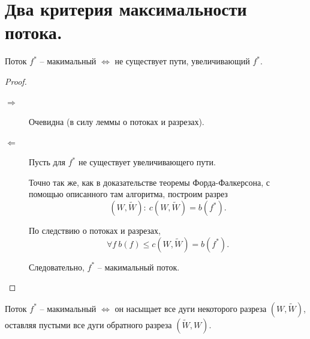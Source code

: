 \section{Два критерия максимальности потока.}

\begin{theorem}
    Поток $ f^* $ -- макимальный $ \iff $ не существует пути, увеличивающий $ f^* $.
\end{theorem}

\begin{proof}\leavevmode
    \begin{description}
        \item[$ \boxed{\Rightarrow} $] Очевидна (в силу леммы о потоках и разрезах).
        \item[$ \boxed{\Leftarrow} $] Пусть для $ f^* $ не существует увеличивающего пути.

              Точно так же, как в доказательстве теоремы Форда-Фалкерсона, с помощью описанного там алгоритма, построим разрез
              \[
                  (W,\widetilde{W}): \ c(W,\widetilde{W}) = b(f^*).
              \]

              По следствию о потоках и разрезах,
              \[
                  \forall f \ b(f) \leqslant c(W,\widetilde{W}) = b(f^*).
              \]

              Следовательно, $ f^* $ -- макимальный поток.
    \end{description}
\end{proof}

\begin{theorem}
    Поток $ f^* $ -- макимальный $ \iff $ он насыщает все дуги некоторого разреза $ (W,\widetilde{W}) $, оставляя пустыми все дуги обратного разреза $ (\widetilde{W},W) $.
\end{theorem}

